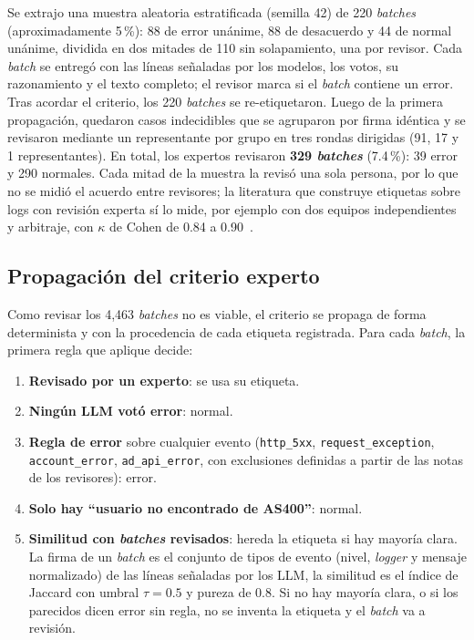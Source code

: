 Se extrajo una muestra aleatoria estratificada (semilla 42) de 220 \textit{batches} (aproximadamente 5\,\%): 88 de error unánime, 88 de desacuerdo y 44 de normal unánime, dividida en dos mitades de 110 sin solapamiento, una por revisor. Cada \textit{batch} se entregó con las líneas señaladas por los modelos, los votos, su razonamiento y el texto completo; el revisor marca si el \textit{batch} contiene un error. Tras acordar el criterio, los 220 \textit{batches} se re-etiquetaron. Luego de la primera propagación, quedaron casos indecidibles que se agruparon por firma idéntica y se revisaron mediante un representante por grupo en tres rondas dirigidas (91, 17 y 1 representantes). En total, los expertos revisaron \textbf{329 \textit{batches}} (7.4\,\%): 39 error y 290 normales. Cada mitad de la muestra la revisó una sola persona, por lo que no se midió el acuerdo entre revisores; la literatura que construye etiquetas sobre logs con revisión experta sí lo mide, por ejemplo con dos equipos independientes y arbitraje, con $\kappa$ de Cohen de 0.84 a 0.90~\cite{sun2026_parsing}.

\subsection{Propagación del criterio experto}\label{subsec:met_propagacion}

Como revisar los 4{,}463 \textit{batches} no es viable, el criterio se propaga de forma determinista y con la procedencia de cada etiqueta registrada. Para cada \textit{batch}, la primera regla que aplique decide:

\begin{enumerate}
  \item \textbf{Revisado por un experto}: se usa su etiqueta.
  \item \textbf{Ningún LLM votó error}: normal.
  \item \textbf{Regla de error} sobre cualquier evento (\texttt{http\_5xx}, \texttt{request\_exception}, \texttt{account\_error}, \texttt{ad\_api\_error}, con exclusiones definidas a partir de las notas de los revisores): error.
  \item \textbf{Solo hay ``usuario no encontrado de AS400''}: normal.
  \item \textbf{Similitud con \textit{batches} revisados}: hereda la etiqueta si hay mayoría clara. La firma de un \textit{batch} es el conjunto de tipos de evento (nivel, \textit{logger} y mensaje normalizado) de las líneas señaladas por los LLM, la similitud es el índice de Jaccard con umbral $\tau=0.5$ y pureza de 0.8. Si no hay mayoría clara, o si los parecidos dicen error sin regla, no se inventa la etiqueta y el \textit{batch} va a revisión.
\end{enumerate}

